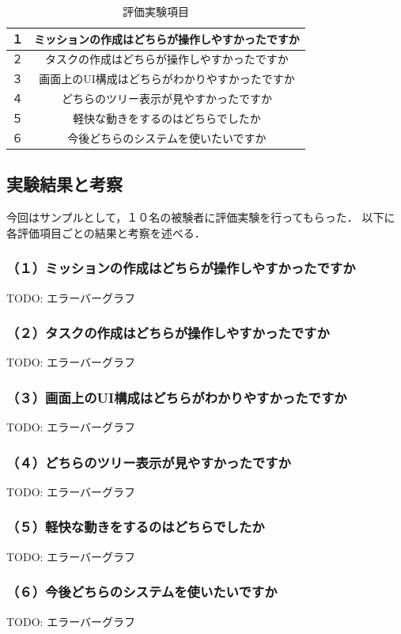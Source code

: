 \begin{table}[t]
 \caption{評価実験項目}
 \begin{center}
	 \begin{tabular}{ | c | c | } \hline
			１ & ミッションの作成はどちらが操作しやすかったですか \\ \hline
 			２ & タスクの作成はどちらが操作しやすかったですか \\ \hline
 			３ & 画面上のUI構成はどちらがわかりやすかったですか \\ \hline
 			４ & どちらのツリー表示が見やすかったですか \\ \hline
 			５ & 軽快な動きをするのはどちらでしたか \\ \hline
 			６ & 今後どちらのシステムを使いたいですか \\ \hline
	 \end{tabular}
	 \label{table:experiment_question}
 \end{center}
\end{table}

\subsection{実験結果と考察}
今回はサンプルとして，１０名の被験者に評価実験を行ってもらった．
以下に各評価項目ごとの結果と考察を述べる．

\subsubsection{（１）ミッションの作成はどちらが操作しやすかったですか}
TODO: エラーバーグラフ

\subsubsection{（２）タスクの作成はどちらが操作しやすかったですか}
TODO: エラーバーグラフ

\subsubsection{（３）画面上のUI構成はどちらがわかりやすかったですか}
TODO: エラーバーグラフ

\subsubsection{（４）どちらのツリー表示が見やすかったですか}
TODO: エラーバーグラフ

\subsubsection{（５）軽快な動きをするのはどちらでしたか}
TODO: エラーバーグラフ

\subsubsection{（６）今後どちらのシステムを使いたいですか}
TODO: エラーバーグラフ
